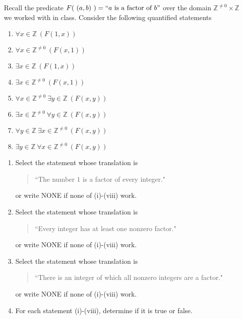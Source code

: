 
Recall the predicate  $F(~(a,b)~)  = ``a \text{ is a factor of } b"$ over  
the domain $\mathbb{Z}^{\neq 0} \times \mathbb{Z}$ we worked with 
in class. Consider the following quantified
statements
\begin{multicols}{2}
\begin{enumerate}[label=(\roman*)]
\item $\forall x \in \mathbb{Z} ~(F(1,x))$
\item $\forall x \in \mathbb{Z}^{\neq 0} ~(F(x,1))$
\item $\exists x \in \mathbb{Z} ~(F(1,x))$
\item $\exists x \in \mathbb{Z}^{\neq 0} ~(F(x,1))$
\item $\forall x \in \mathbb{Z}^{\neq 0} ~\exists y \in \mathbb{Z} ~(F(x,y))$
\item $\exists x \in \mathbb{Z}^{\neq 0} ~\forall y \in \mathbb{Z} ~(F(x,y))$
\item $\forall y \in \mathbb{Z} ~\exists x \in \mathbb{Z}^{\neq 0} ~(F(x,y))$
\item $\exists y \in \mathbb{Z} ~\forall x \in \mathbb{Z}^{\neq 0} ~(F(x,y))$
\end{enumerate}
\end{multicols}
\begin{enumerate}
\item Select the statement whose translation is
\begin{quote}
``The number $1$ is  a factor of every integer."
\end{quote}
or write NONE if none of (i)-(viii) work.

\item Select the statement whose translation is
\begin{quote}
``Every integer has at least one nonzero factor."
\end{quote}
or write NONE if none of (i)-(viii) work.

\item Select the statement whose translation is
\begin{quote}
``There is an integer of which
all nonzero integers are a factor."
\end{quote}
or write NONE if none of (i)-(viii) work.

\item For each  statement (i)-(viii), determine
if  it is true or  false.
\end{enumerate}